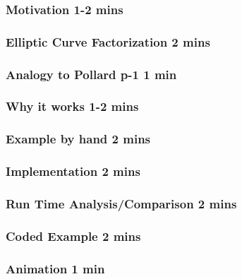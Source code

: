 \documentclass{beamer}
\begin{document}
\begin{frame}
\frametitle{Motivation 1-2 mins}
\end{frame}

\begin{frame}
\frametitle{Elliptic Curve Factorization 2 mins}

\end{frame}

\begin{frame}
\frametitle{Analogy to Pollard p-1 1 min}

\end{frame}

\begin{frame}
\frametitle{Why it works 1-2 mins}

\end{frame}

\begin{frame}
\frametitle{Example by hand 2 mins}

\end{frame}

\begin{frame}
\frametitle{Implementation 2 mins}

\end{frame}

\begin{frame}
\frametitle{Run Time Analysis/Comparison 2 mins}

\end{frame}

\begin{frame}
\frametitle{Coded Example 2 mins}

\end{frame}

\begin{frame}
\frametitle{Animation 1 min}

\end{frame}
\end{document}
